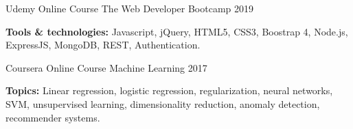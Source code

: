 \begin{cventries}
\cventry
{Udemy Online Course} %
{The Web Developer Bootcamp} %
{} %
{2019} %
{ %
\begin{cvitems}
\item{\textbf{Tools \& technologies:} Javascript, jQuery, HTML5, CSS3, Boostrap 4, Node.js, ExpressJS, MongoDB, REST, Authentication. \\}
\end{cvitems}
}

\cventry
{Coursera Online Course} %
{Machine Learning} %
{} %
{2017} %
{ %
\begin{cvitems}
\item {\textbf{Topics:} Linear regression, logistic regression, regularization, neural networks, SVM, unsupervised learning, dimensionality reduction, anomaly detection, recommender systems.\\}
\end{cvitems}
}




\end{cventries}